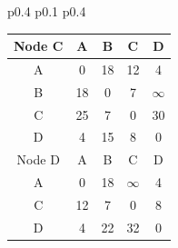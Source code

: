 \documentclass{article}
\begin{document}
\begin{tabular}{p{0.4\linewidth} p{0.1\linewidth} p{0.4\linewidth}}
\begin{tabular}{c|c|c|c|c}
        \hline
        \hline
        Node C & A & B & C & D \\
        \hline
        A & 0 & 18 & 12 & 4 \\
        B & 18 & 0 & 7 & \color{red}$\infty$ \\
        C & \color{red}25 & 7 & 0 & \color{red}30 \\
        D & 4 & 15 & 8 & 0 \\
        \hline
        \hline
        Node D & A & B & C & D \\
        \hline
        A & 0 & 18 & \color{red}$\infty$ & 4 \\
        C & 12 & 7 & 0 & 8 \\
        D & 4 & \color{red}22 & \color{red}32 & 0 \\
        \hline
    \end{tabular} \\ \\ \\ 


\end{tabular}
\end{document}
